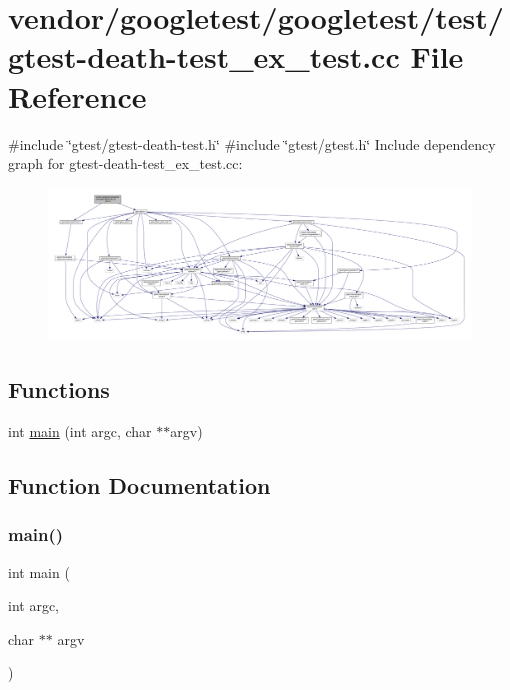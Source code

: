 \hypertarget{gtest-death-test__ex__test_8cc}{}\section{vendor/googletest/googletest/test/gtest-\/death-\/test\+\_\+ex\+\_\+test.cc File Reference}
\label{gtest-death-test__ex__test_8cc}
{\ttfamily \#include \char`\"{}gtest/gtest-\/death-\/test.\+h\char`\"{}}\newline
{\ttfamily \#include \char`\"{}gtest/gtest.\+h\char`\"{}}\newline
Include dependency graph for gtest-\/death-\/test\+\_\+ex\+\_\+test.cc\+:
\nopagebreak
\begin{figure}[H]
\begin{center}
\leavevmode
\includegraphics[width=350pt]{gtest-death-test__ex__test_8cc__incl}
\end{center}
\end{figure}
\subsection*{Functions}
\begin{DoxyCompactItemize}
\item 
int \hyperlink{gtest-death-test__ex__test_8cc_a3c04138a5bfe5d72780bb7e82a18e627}{main} (int argc, char $\ast$$\ast$argv)
\end{DoxyCompactItemize}


\subsection{Function Documentation}
\mbox{\label{gtest-death-test__ex__test_8cc_a3c04138a5bfe5d72780bb7e82a18e627}} 
\subsubsection{\texorpdfstring{main()}{main()}}
{\footnotesize\ttfamily int main (\begin{DoxyParamCaption}\item[{int}]{argc,  }\item[{char $\ast$$\ast$}]{argv }\end{DoxyParamCaption})}

